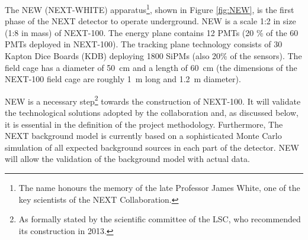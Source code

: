 The NEW (NEXT-WHITE) apparatus\footnote{The name honours the memory of the late Professor James White, one of the key scientists of the NEXT Collaboration.}, shown in Figure \ref{fig:NEW}, is the first phase of the NEXT detector to operate underground. NEW 
%
%
is a scale 1:2 in size (1:8 in mass) of NEXT-100. The energy plane contains 12 PMTs (20 \% of the 60 PMTs deployed in NEXT-100). The tracking plane technology consists of 30 Kapton Dice Boards (KDB) deploying 1800 SiPMs (also 20\% of the sensors). The field cage has a diameter of 50~cm and a length of 60~cm (the dimensions of the NEXT-100 field cage are roughly 1~m long and 1.2~m diameter). 

NEW is a necessary step\footnote{As formally stated by the scientific committee of the LSC, who recommended its construction in 2013.} towards the construction of NEXT-100. It will validate the technological solutions adopted by the collaboration and, as discussed below, it is essential in the definition of the project methodology. Furthermore, The NEXT background model is currently based on a sophisticated Monte Carlo simulation of all expected background sources in each part of the detector. NEW will allow the validation of the background model with actual data. 

%
